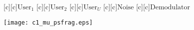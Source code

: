 \documentclass{article}
\begin{document}
\begin{figure}[htb]
  \begin{center}

        [c][c]{$\mathrm{User}_1$}
        [c][c]{$\mathrm{User}_2$}
        [c][c]{\hspace{1mm}$\mathrm{User}_U$}
        [c][c]{$\mathrm{Noise}$}
        [c][c]{\hspace{12mm}$\mathrm{Demodulator}$}

    \texttt{[image: c1\_mu\_psfrag.eps]}
    \end{center}
\end{figure}
\end{document}
